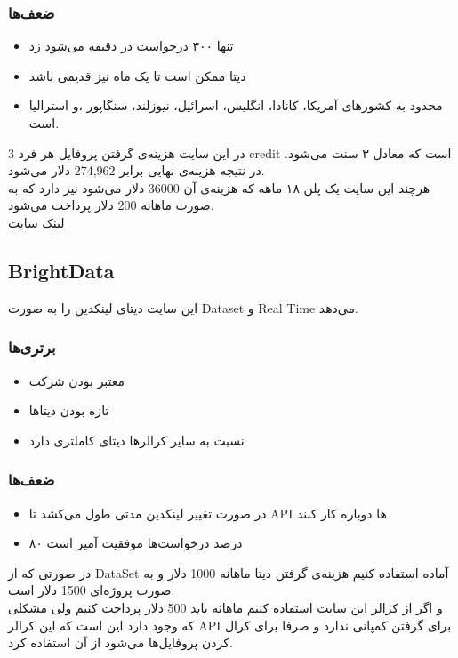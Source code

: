 \subsubsection{ضعف‌ها}
\begin{itemize}
    \item تنها ۳۰۰ درخواست در دقیقه می‌شود زد
    \item دیتا ممکن است تا یک ماه نیز قدیمی باشد
    \item محدود به کشورهای آمریکا، کانادا، انگلیس، اسرائیل، نیوزلند، سنگاپور ،و استرالیا است.
\end{itemize}

در این سایت هزینه‌ی گرفتن پروفایل هر فرد 3 credit است که معادل ۳ سنت می‌شود. در نتیجه هزینه‌ی نهایی برابر 274,962 دلار می‌شود.\\
هرچند این سایت یک پلن ۱۸ ماهه که هزینه‌ی آن 36000 دلار می‌شود نیز دارد که به صورت ماهانه 200 دلار پرداخت می‌شود.\\

\href{https://nubela.co/proxycurl}{لینک سایت}

\subsection{BrightData}

این سایت دیتای لینکدین را به صورت Dataset و Real Time می‌دهد.

\subsubsection{برتری‌ها}
\begin{itemize}
    \item معتبر بودن شرکت
    \item تازه بودن دیتاها
    \item نسبت به سایر کرالرها دیتای کاملتری دارد
\end{itemize}
\subsubsection{ضعف‌ها}
\begin{itemize}
    \item در صورت تغییر لینکدین مدتی طول می‌کشد تا API ها دوباره کار کنند
    \item ۸۰ درصد درخواست‌ها موفقیت آمیز است
\end{itemize}
در صورتی که از DataSet آماده استفاده کنیم 
هزینه‌ی گرفتن دیتا ماهانه 1000 دلار و به صورت پروژه‌ای 1500 دلار است.\\
و اگر از کرالر این سایت استفاده کنیم ماهانه باید 500 دلار پرداخت کنیم ولی مشکلی که وجود دارد این است که این کرالر API برای گرفتن کمپانی ندارد و صرفا برای کرال کردن پروفایل‌ها می‌شود از آن استفاده کرد.

